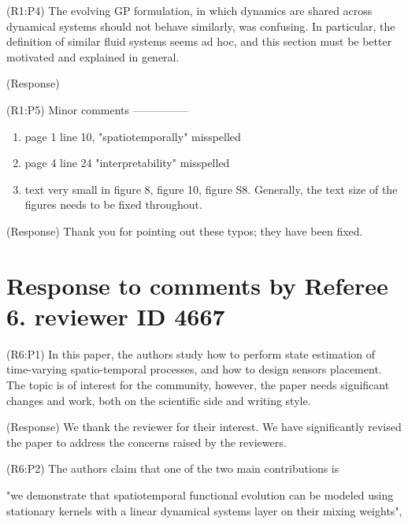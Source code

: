 \documentclass{letter}
\begin{document}
{\color{red}(R1:P4)} The evolving GP formulation, in which dynamics are shared across
dynamical systems should not behave similarly, was confusing. In
particular, the definition of similar fluid systems seems ad hoc, and
this section must be better motivated and explained in general. 

{\color{red}(Response)}


{\color{red}(R1:P5)} Minor comments
---------------
\begin{enumerate}
\item page 1 line 10, "spatiotemporally" misspelled
\item page 4 line 24 "interpretability" misspelled
\item text very small in figure 8, figure 10, figure S8. Generally, the
text size of the figures needs to be fixed throughout.
\end{enumerate}

{\color{red}(Response)} Thank you for pointing out these typos; they have been fixed.



\section{Response to comments by Referee 6. reviewer ID 4667}

{\color{red}(R6:P1)} In this paper, the authors study how to perform state estimation of
time-varying spatio-temporal processes, and how to design sensors
placement. 
The topic is of interest for the community, however, the
paper needs significant changes and work, both on the scientific side
and writing style. 

{\color{red}(Response)} We thank the reviewer for their interest. We have significantly revised the paper to address the concerns raised by the reviewers.

{\color{red}(R6:P2)} The authors claim that one of the two main contributions is 

"we demonstrate that spatiotemporal functional evolution can be modeled
using stationary kernels with a linear dynamical systems layer on their
mixing weights",
\end{document}

